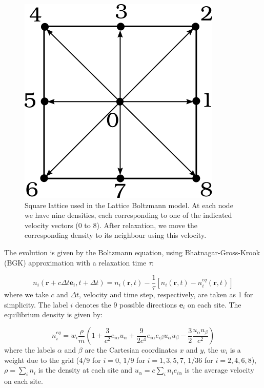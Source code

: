 \documentclass[aps,prl,reprint,groupedaddress]{revtex4-1}
\begin{document}
\begin{figure}[hb]
	\includegraphics[scale=0.3]{array.png}
	\caption{Square lattice used in the Lattice Boltzmann model. At each node we have nine densities, each corresponding to one of the indicated velocity vectors (0 to 8). After relaxation, we move the corresponding density to its neighbour using this velocity. \label{lattice}}
\end{figure} 

The evolution is given by the Boltzmann equation, using Bhatnagar-Gross-Krook (BGK) approximation with a relaxation time $\tau$:

\begin{equation} \label{relax}
n_{i}(\mathbf{r}+c\Delta t\mathbf{e}_{i},t+\Delta t) = n_{i}(\mathbf{r},t)-\frac{1}{\tau}\left [n_{i}(\mathbf{r},t)-n_{i}^{eq}(\mathbf{r},t)  \right ]
\end{equation}
where we take $c$ and $\Delta t$, velocity and time step, respectively, are taken as 1 for simplicity. The label $i$ denotes the 9 possible directions $\mathbf{e}_{i}$ on each site.  The equilibrium density is given by:

\begin{equation} \label{equil}
n_i^{eq} = w_i\frac{\rho}{m}\left(1+\frac{3}{c^2}e_{i\alpha}u_\alpha + \frac{9}{2c^4}e_{i\alpha}e_{i\beta}u_\alpha u_\beta - \frac{3}{2}\frac{u_\alpha u_\beta}{c^2}\right)
\end{equation}
where the labels $\alpha$ and $\beta$ are the Cartesian coordinates $x$ and $y$, the $w_i$ is a weight due to the grid ($4/9$ for $i=0$, $1/9$ for $i=1,3,5,7$, $1/36$ for $i=2,4,6,8$), $\rho = \sum_i n_i$ is the density at each site and $u_{\alpha} = c \sum_i n_i e_{i\alpha}$ is the average velocity on each site.
\end{document}
